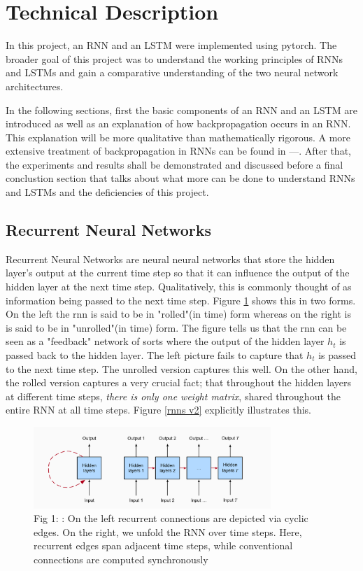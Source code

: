 \documentclass[12pt, letterpaper]{article}
\begin{document}


\section{Technical Description}

In this project, an RNN and an LSTM were implemented using pytorch.
The broader goal of this project was to understand the working principles of
RNNs and LSTMs and gain a comparative understanding of the two neural network
architectures. 

In the following sections, first the basic components of an RNN and an LSTM 
are introduced as well as an explanation of how backpropagation occurs in an 
RNN. This explanation will be more qualitative than mathematically rigorous. 
A more extensive treatment of backpropagation in RNNs can be found in ---. After that, the experiments and results shall be demonstrated and discussed before
a final conclustion section that talks about what more can be done to understand
RNNs and LSTMs and the deficiencies of this project.

\subsection{Recurrent Neural Networks}

Recurrent Neural Networks are neural neural networks that store the 
hidden layer's output at the current time step so that it can influence
the output of the hidden layer at the next time step. Qualitatively,
this is commonly thought of as information being passed to the next time
step. Figure \ref{fig: rnns v1} shows this in two forms. On the left the 
rnn is said to be in "rolled"(in time) form whereas on the right is is said to be 
in "unrolled"(in time) form. The figure tells us that the rnn can be seen as a "feedback"
network of sorts where the output of the hidden layer $h_t$ is passed back to the hidden layer.
The left picture fails to capture that $h_t$ is passed to the next time step. The unrolled 
version captures this well. On the other hand, the rolled version captures a very crucial 
fact; that throughout the hidden layers at different time steps, \textit{there is only 
one weight matrix}, shared throughout the entire RNN at all time steps. Figure \ref{rnns v2} explicitly
illustrates this.

\begin{figure}[htpb]
    \centering
    \includegraphics[width=0.8\textwidth]{d2l_ai_rnn_v1.png}
    \caption{Fig 1: \cite{zhang2023dive}: On the left recurrent connections are depicted via cyclic edges. 
    On the right, we unfold the RNN over time steps. Here, recurrent edges span 
    adjacent time steps, while conventional connections are computed synchronously}
    \label{fig: rnns v1}
\end{figure}
\end{document}
